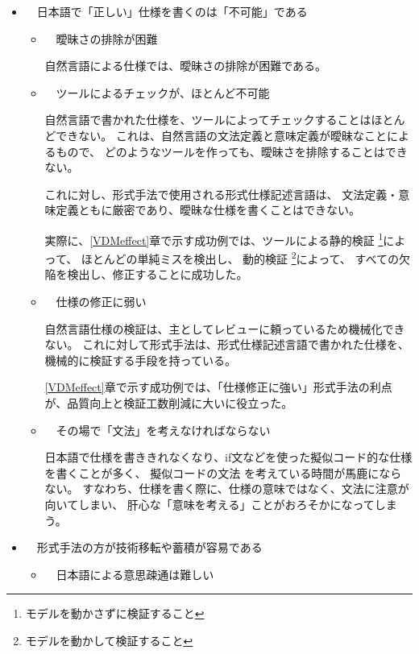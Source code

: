 \begin{itemize}
\item　日本語で「正しい」仕様を書くのは「不可能」である

	\begin{itemize}
	\item　曖昧さの排除が困難

		自然言語による仕様では、曖昧さの排除が困難である。

	\item　ツールによるチェックが、ほとんど不可能

		自然言語で書かれた仕様を、ツールによってチェックすることはほとんどできない。
		これは、自然言語の文法定義と意味定義が曖昧なことによるもので、
		どのようなツールを作っても、曖昧さを排除することはできない。
		
		これに対し、形式手法で使用される形式仕様記述言語は、
		文法定義・意味定義ともに厳密であり、曖昧な仕様を書くことはできない。

		実際に、\ref{VDMeffect}章で示す成功例では、ツールによる静的検証
		\footnote{モデルを動かさずに検証すること}によって、
		ほとんどの単純ミスを検出し、
		動的検証
		\footnote{モデルを動かして検証すること}によって、
		すべての欠陥を検出し、修正することに成功した。

	\item　仕様の修正に弱い

		自然言語仕様の検証は、主としてレビューに頼っているため機械化できない。
		これに対して形式手法は、形式仕様記述言語で書かれた仕様を、機械的に検証する手段を持っている。
		
		\ref{VDMeffect}章で示す成功例では、「仕様修正に強い」形式手法の利点が、品質向上と検証工数削減に大いに役立った。
		
	\item　その場で「文法」を考えなければならない

		日本語で仕様を書ききれなくなり、if文などを使った擬似コード的な仕様を書くことが多く、
		擬似コードの文法
		を考えている時間が馬鹿にならない。
		すなわち、仕様を書く際に、仕様の意味ではなく、文法に注意が向いてしまい、
		肝心な「意味を考える」ことがおろそかになってしまう。

	\end{itemize} 

\item　形式手法の方が技術移転や蓄積が容易である

	\begin{itemize}
	\item　日本語による意思疎通は難しい



\end{itemize}
\end{itemize}
